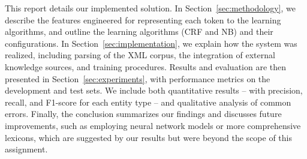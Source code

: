 This report details our implemented solution. In Section~\ref{sec:methodology}, we describe the features engineered for representing each token to the learning algorithms, and outline the learning algorithms (CRF and NB) and their configurations. In Section~\ref{sec:implementation}, we explain how the system was realized, including parsing of the XML corpus, the integration of external knowledge sources, and training procedures. Results and evaluation are then presented in Section~\ref{sec:experiments}, with performance metrics on the development and test sets. We include both quantitative results – with precision, recall, and F1-score for each entity type – and qualitative analysis of common errors. Finally, the conclusion summarizes our findings and discusses future improvements, such as employing neural network models or more comprehensive lexicons, which are suggested by our results but were beyond the scope of this assignment.
